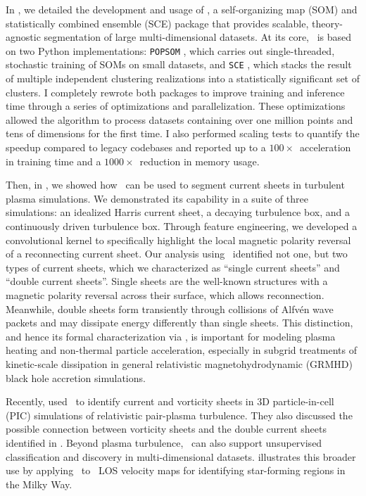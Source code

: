 In \citet{ha_awesom_2025}, we detailed the development and usage of \awesom, a self-organizing map (SOM) and statistically combined ensemble (SCE) package that provides scalable, theory-agnostic segmentation of large multi-dimensional datasets.
At its core, \awesom\ is based on two Python implementations: \texttt{POPSOM} \citep{yuan_implementation_2018,hamel_vsom_2019}, which carries out single-threaded, stochastic training of SOMs on small datasets, and \texttt{SCE} \citep{bussov_maarja_segmentation_2021}, which stacks the result of multiple independent clustering realizations into a statistically significant set of clusters.
I completely rewrote both packages to improve training and inference time through a series of optimizations and parallelization.
These optimizations allowed the algorithm to process datasets containing over one million points and tens of dimensions for the first time.
I also performed scaling tests to quantify the speedup compared to legacy codebases and reported up to a $100\times$\ acceleration in training time and a $1000\times$\ reduction in memory usage.

Then, in \citet{ha_machine_2025}, we showed how \awesom\ can be used to segment current sheets in turbulent plasma simulations.
We demonstrated its capability in a suite of three simulations: an idealized Harris current sheet, a decaying turbulence box, and a continuously driven turbulence box.
Through feature engineering, we developed a convolutional kernel to specifically highlight the local magnetic polarity reversal of a reconnecting current sheet.
Our analysis using \awesom\ identified not one, but two types of current sheets, which we characterized as ``single current sheets'' and ``double current sheets''.
Single sheets are the well-known structures with a magnetic polarity reversal across their surface, which allows reconnection.
Meanwhile, double sheets form transiently through collisions of Alfv\'en wave packets and may dissipate energy differently than single sheets.
This distinction, and hence its formal characterization via \awesom, is important for modeling plasma heating and non-thermal particle acceleration, especially in subgrid treatments of kinetic-scale dissipation in general relativistic magnetohydrodynamic (GRMHD) black hole accretion simulations.

Recently, \citet{davis_statistics_2025} used \awesom\ to identify current and vorticity sheets in 3D particle-in-cell (PIC) simulations of relativistic pair-plasma turbulence.
They also discussed the possible connection between vorticity sheets and the double current sheets identified in \citet{ha_machine_2025}.
Beyond plasma turbulence, \awesom\ can also support unsupervised classification and discovery in multi-dimensional datasets.  illustrates this broader use by applying \awesom\ to \halpha\ LOS velocity maps for identifying star-forming regions in the Milky Way.

